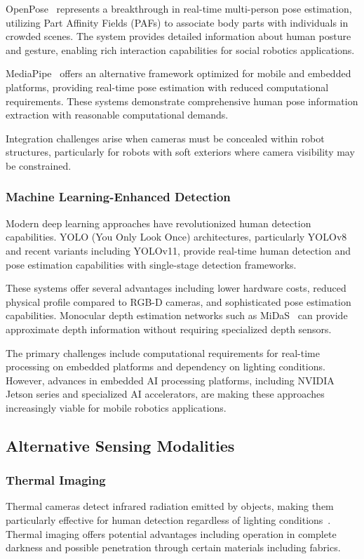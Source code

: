 OpenPose~\cite{cao2019openpose} represents a breakthrough in real-time multi-person pose estimation, utilizing Part Affinity Fields (PAFs) to associate body parts with individuals in crowded scenes. The system provides detailed information about human posture and gesture, enabling rich interaction capabilities for social robotics applications.

MediaPipe~\cite{lugaresi2019mediapipe} offers an alternative framework optimized for mobile and embedded platforms, providing real-time pose estimation with reduced computational requirements. These systems demonstrate comprehensive human pose information extraction with reasonable computational demands.

Integration challenges arise when cameras must be concealed within robot structures, particularly for robots with soft exteriors where camera visibility may be constrained.

\subsubsection{Machine Learning-Enhanced Detection}
Modern deep learning approaches have revolutionized human detection capabilities. YOLO (You Only Look Once) architectures, particularly YOLOv8~\cite{redmon2016you} and recent variants including YOLOv11, provide real-time human detection and pose estimation capabilities with single-stage detection frameworks.

These systems offer several advantages including lower hardware costs, reduced physical profile compared to RGB-D cameras, and sophisticated pose estimation capabilities. Monocular depth estimation networks such as MiDaS~\cite{ranftl2020towards} can provide approximate depth information without requiring specialized depth sensors.

The primary challenges include computational requirements for real-time processing on embedded platforms and dependency on lighting conditions. However, advances in embedded AI processing platforms, including NVIDIA Jetson series and specialized AI accelerators, are making these approaches increasingly viable for mobile robotics applications.

\subsection{Alternative Sensing Modalities}
\subsubsection{Thermal Imaging}
Thermal cameras detect infrared radiation emitted by objects, making them particularly effective for human detection regardless of lighting conditions~\cite{thermal2019detection}. Thermal imaging offers potential advantages including operation in complete darkness and possible penetration through certain materials including fabrics.

